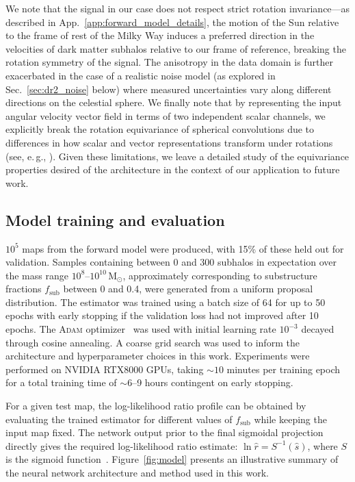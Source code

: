 \documentclass[twocolumn,linenumbers,anonymous]{aastex631}
\newcommand{\eg}{{e.\,g.}\xspace}
\newcommand{\changes}[1]{{{\color{red}#1}}}
\begin{document}
\changes{We note that the signal in our case does not respect strict rotation invariance---as described in App.~\ref{app:forward_model_details}, the motion of the Sun relative to the frame of rest of the Milky Way induces a preferred direction in the velocities of dark matter subhalos relative to our frame of reference, breaking the rotation symmetry of the signal. The anisotropy in the data domain is further exacerbated in the case of a realistic noise model (as explored in Sec.~\ref{sec:dr2_noise} below) where measured uncertainties vary along different directions on the celestial sphere. We finally note that by representing the input angular velocity vector field in terms of two independent scalar channels, we explicitly break the rotation equivariance of spherical convolutions due to differences in how scalar and vector representations transform under rotations (see, \eg, \citet{DBLP:conf/nips/EstevesMD20}). Given these limitations, we leave a detailed study of the equivariance properties desired of the architecture in the context of our application to future work.}

\subsection{Model training and evaluation} 

$10^5$ maps from the forward model were produced, with 15\% of these held out for validation. \changes{Samples containing between 0 and 300 subhalos in expectation over the mass range $10^{8}$--$10^{10}\,\mathrm{M}_\odot$, approximately corresponding to substructure fractions $f_\mathrm{sub}$ between 0 and 0.4, were generated from a uniform proposal distribution.} The estimator was trained using a batch size of 64 for up to 50 epochs with early stopping if the validation loss had not improved after 10 epochs. The \textsc{Adam} optimizer~\citep{kingma2017adam} was used with initial learning rate $10^{-3}$ decayed through cosine annealing. A coarse grid search was used to inform the architecture and hyperparameter choices in this work. \changes{Experiments were performed on NVIDIA RTX8000 GPUs, taking $\sim10$ minutes per training epoch for a total training time of $\sim6$--9 hours contingent on early stopping.}

For a given test map, the log-likelihood ratio profile can be obtained by evaluating the trained estimator for different values of $f_\mathrm{sub}$ while keeping the input map fixed. The network output prior to the final sigmoidal projection directly gives the required log-likelihood ratio estimate: $\ln\hat r = S^{-1}(\hat s)$, where $S$ is the sigmoid function~\citep{Hermans:2019ioj,Hermans:2020skz}.
Figure~\ref{fig:model} presents an illustrative summary of the neural network architecture and method used in this work. \vspace{0.5cm}
\end{document}
